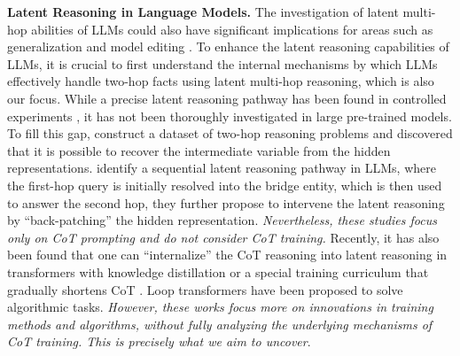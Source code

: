 \textbf{Latent Reasoning in Language Models.} The investigation of latent multi-hop abilities of LLMs could also have significant implications for areas such as generalization \citep{pmlr-v80-lake18a,onoe-etal-2023-lms} and model editing \citep{zhong-etal-2023-mquake,10.1162/tacl_a_00644}. To enhance the latent reasoning capabilities of LLMs, it is crucial to first understand the internal mechanisms by which LLMs effectively handle two-hop facts using latent multi-hop reasoning, which is also our focus. While a precise latent reasoning pathway has been found in controlled experiments \citep{stolfo-etal-2023-mechanistic,nanda2023progress,conmy2023towards,brinkmann-etal-2024-mechanistic,li-etal-2024-understanding,rai-yao-2024-investigation,yao2024knowledge,wang2024grokking}, it has not been thoroughly investigated in large pre-trained models. To fill this gap, \citet{yang2024largelanguagemodelslatently} construct a dataset of two-hop reasoning problems and discovered that it is possible to recover the intermediate variable from the hidden representations. \citet{biran2024hoppinglateexploringlimitations} identify a sequential latent reasoning pathway in LLMs, where the first-hop query is initially resolved into the bridge entity, which is then used to answer the second hop, they further propose to intervene the latent reasoning by “back-patching” the hidden representation. \textit{Nevertheless, these studies focus only on CoT prompting and do not consider CoT training.} Recently, it has also been found that one can “internalize” the CoT reasoning into latent reasoning in transformers with knowledge distillation \citep{deng2023implicitchainthoughtreasoning} or a special training curriculum that gradually shortens
CoT \citep{deng2024explicitcotimplicitcot}. Loop transformers \citep{giannou2023looped,cabannes2024iteration,fan2024loopedtransformerslengthgeneralization} have been proposed to solve algorithmic tasks. \textit{However, these works focus more on innovations in training methods and algorithms, without fully analyzing the underlying mechanisms of CoT training. This is precisely what we aim to uncover}.
\newpage